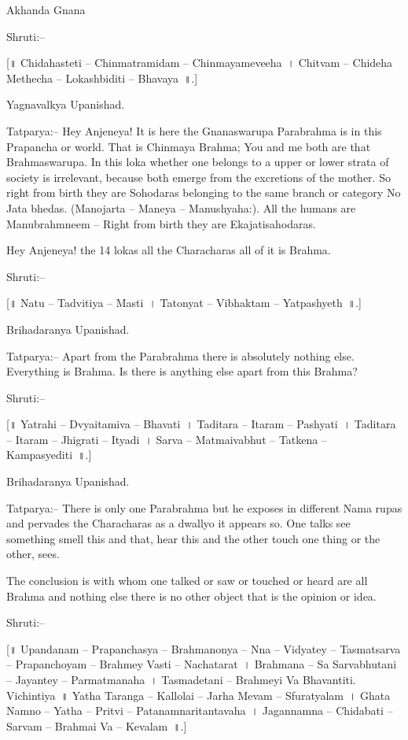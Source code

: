 Akhanda Gnana

Shruti:–

[॥ Chidahasteti – Chinmatramidam – Chinmayameveeha~। Chitvam – Chideha Methecha – Lokashbiditi – Bhavaya~॥.]

Yagnavalkya Upanishad.

Tatparya:– Hey Anjeneya! It is here the Gnanaswarupa Parabrahma is in this Prapancha or world. That is Chinmaya Brahma; You and me both are that Brahmaswarupa. In this loka whether one belongs to a upper or lower strata of society is irrelevant, because both emerge from the excretions of the mother. So right from birth they are Sohodaras belonging to the same branch or category No Jata bhedas. (Manojarta – Maneya – Manushyaha:). All the humans are Manubrahmneem – Right from birth they are Ekajatisahodaras.

Hey Anjeneya! the 14 lokas all the Characharas all of it is Brahma.

Shruti:–

[॥ Natu – Tadvitiya – Masti~। Tatonyat – Vibhaktam – Yatpashyeth~॥.]

Brihadaranya Upanishad.

Tatparya:– Apart from the Parabrahma there is absolutely nothing else. Everything is Brahma. Is there is anything else apart from this Brahma?

Shruti:–

[॥ Yatrahi – Dvyaitamiva – Bhavati~। Taditara – Itaram – Pashyati~। Taditara – Itaram – Jhigrati – Ityadi~। Sarva – Matmaivabhut – Tatkena – Kampasyediti~॥.]

Brihadaranya Upanishad.

Tatparya:– There is only one Parabrahma but he exposes in different Nama rupas and pervades the Characharas as a dwallyo it appears so. One talks see something smell this and that, hear this and the other touch one thing or the other, sees.

The conclusion is with whom one talked or saw or touched or heard are all Brahma and nothing else there is no other object that is the opinion or idea.

Shruti:–

[॥ Upandanam – Prapanchasya – Brahmanonya – Nna – Vidyatey – Tasmatsarva – Prapanchoyam – Brahmey Vasti – Nachatarat~। Brahmana – Sa Sarvabhutani – Jayantey – Parmatmanaha~। Tasmadetani – Brahmeyi Va Bhavantiti. Vichintiya~॥ Yatha Taranga – Kallolai – Jarha Mevam – Sfuratyalam~। Ghata Namno – Yatha – Pritvi – Patanamnaritantavaha~। Jagannamna – Chidabati – Sarvam – Brahmai Va – Kevalam~॥.]

